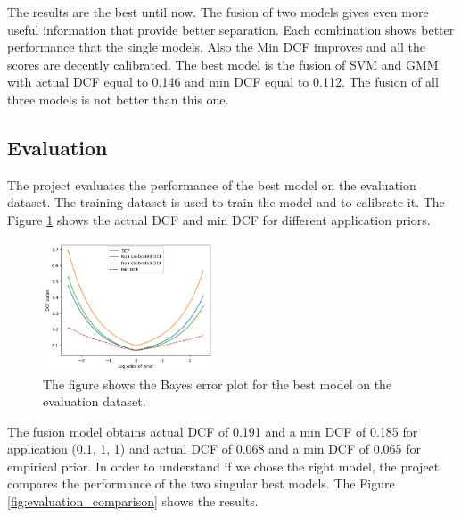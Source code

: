 \documentclass{article}
\begin{document}
The results are the best until now. The fusion of two models gives even more useful information that provide better separation. Each combination shows better performance that the single models. Also the Min DCF improves and all the scores are decently calibrated. The best model is the fusion of SVM and GMM with actual DCF equal to 0.146 and min DCF equal to 0.112. The fusion of all three models is not better than this one.

\subsection{Evaluation}
The project evaluates the performance of the best model on the evaluation dataset. The training dataset is used to train the model and to calibrate it. The Figure \ref{fig:evaluation} shows the actual DCF and min DCF for different application priors.

\begin{figure}[ht]
    \centering
    \includegraphics[width=0.45\textwidth]{images/evaluation.png}
    \caption{The figure shows the Bayes error plot for the best model on the evaluation dataset.}
    \label{fig:evaluation}
\end{figure}

The fusion model obtains actual DCF of 0.191 and a min DCF of 0.185 for application (0.1, 1, 1) and actual DCF of 0.068 and a min DCF of 0.065 for empirical prior. In order to understand if we chose the right model, the project compares the performance of the two singular best models. The Figure \ref{fig:evaluation_comparison} shows the results.
\end{document}
